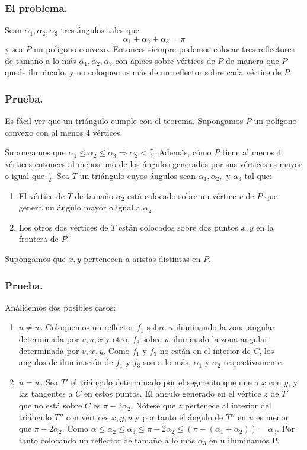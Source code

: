 \begin{frame}
    \frametitle{El problema.}    
    \begin{teorema} %
      Sean $\alpha_1, \alpha_2, \alpha_3$ tres ángulos tales que
      \[\alpha_1 + \alpha_2 + \alpha_3 = \pi\]
      y sea $P$ un polígono convexo. Entonces siempre podemos colocar tres reflectores
      de tamaño a lo más $\alpha_1, \alpha_2, \alpha_3$ con ápices sobre vértices de $P$
      de manera que $P$ quede iluminado, y no coloquemos más de un reflector sobre cada
      vértice de $P$.
    \end{teorema}
\end{frame}

\begin{frame}
    \frametitle{Prueba.}    
    Es fácil ver que un triángulo cumple con el teorema. Supongamos $P$ un polígono convexo con al menos $4$
    vértices.\newline

    Supongamos que $\alpha_1 \leq \alpha_2 \leq \alpha_3 \Rightarrow \alpha_2 < \frac{\pi}{2}$.  Además, cómo
    $P$ tiene al menos $4$ vértices entonces al menos uno de los ángulos generados por sus vértices es mayor
    o igual que $\frac{\pi}{2}$. Sea $T$ un triángulo cuyos ángulos sean $\alpha_1, \alpha_2,$ y $\alpha_3$
    tal que:
    \begin{enumerate}
    \item El vértice de $T$ de tamaño $\alpha_2$ está colocado sobre un vértice $v$ de $P$ que genera un ángulo
      mayor o igual a $\alpha_2$.
    \item Los otros dos vértices de $T$ están colocados sobre dos puntos $x, y$ en la frontera de $P$.
    \end{enumerate}
    Supongamos que $x,y$ pertenecen a aristas distintas en $P$.
\end{frame}

\begin{frame}
  \frametitle{Prueba.}
  Análicemos dos posibles casos:
  \begin{enumerate}
  \item $u \not= w$. Coloquemos un reflector $f_1$ sobre $u$ iluminando la zona angular
    determinada por $v, u, x$ y otro, $f_3$ sobre $w$ iluminado la zona angular
    determinada por $v, w, y$. Como $f_1$ y $f_3$ no están en el interior de $C$, los
    angulos de iluminación de $f_1$ y $f_3$ son a lo más, $\alpha_1$ y $\alpha_2$ respectivamente.
  \item $u = w$. Sea $T'$ el triángulo determinado por el segmento que une a $x$ con
    $y$, y las tangentes a $C$ en estos puntos. El ángulo generado en el vértice
    $z$ de $T'$  que no está sobre $C$ es $\pi - 2\alpha_2$. Nótese que $z$ pertenece al interior
    del triángulo $T''$ con vértices $x, y, u$ y por tanto el ángulo de $T''$ en $u$ es
    menor que $\pi - 2\alpha_2$. Como $\alpha \leq \alpha_2 \leq \alpha_3 \leq \pi - 2\alpha_2 \leq (\pi - (\alpha_1 + \alpha_2)) = \alpha_3$.
    Por tanto colocando un reflector de tamaño a lo más $\alpha_3$ en u iluminamos P.
  \end{enumerate}
\end{frame}


